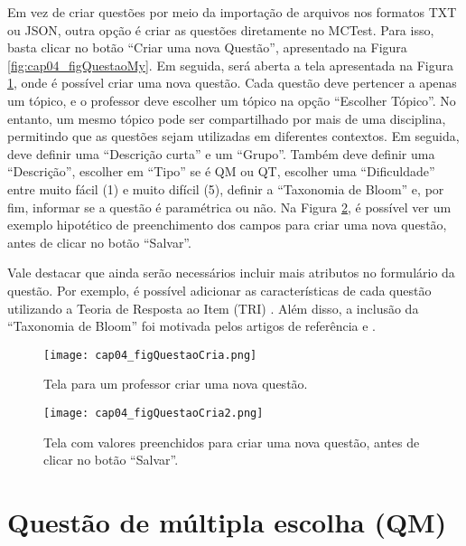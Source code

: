 Em vez de criar questões por meio da importação de arquivos nos formatos TXT ou JSON, outra opção é criar as questões diretamente no MCTest. Para isso, basta clicar no botão ``Criar uma nova Questão'', apresentado na Figura \ref{fig:cap04_figQuestaoMy}. Em seguida, será aberta a tela apresentada na Figura \ref{fig:cap04_figQuestaoCria}, onde é possível criar uma nova questão. Cada questão deve pertencer a apenas um tópico, e o professor deve escolher um tópico na opção ``Escolher Tópico''. No entanto, um mesmo tópico pode ser compartilhado por mais de uma disciplina, permitindo que as questões sejam utilizadas em diferentes contextos. Em seguida, deve definir uma ``Descrição curta'' e um ``Grupo''. Também deve definir uma ``Descrição'', escolher em ``Tipo'' se é QM ou QT, escolher uma ``Dificuldade'' entre muito fácil (1) e muito difícil (5), definir a ``Taxonomia de Bloom'' e, por fim, informar se a questão é paramétrica ou não. Na Figura \ref{fig:cap04_figQuestaoCria2}, é possível ver um exemplo hipotético de preenchimento dos campos para criar uma nova questão, antes de clicar no botão ``Salvar''.

Vale destacar que ainda serão necessários incluir mais atributos no formulário da questão. Por exemplo, é possível adicionar as características de cada questão utilizando a Teoria de Resposta ao Item (TRI) \cite{2021:Zampirolli.Junior.ea,2021:Zampirolli.Batista.ea}. Além disso, a inclusão da ``Taxonomia de Bloom'' foi motivada pelos artigos de referência  e .

\begin{figure}[!ht]
  \centering
  \texttt{[image: cap04\_figQuestaoCria.png]}
  \caption{Tela para um professor criar uma nova questão.}
  \label{fig:cap04_figQuestaoCria}
\end{figure}

\begin{figure}[!ht]
  \centering
  \texttt{[image: cap04\_figQuestaoCria2.png]}
  \caption{Tela com valores preenchidos para criar uma nova questão, antes de clicar no botão ``Salvar''.}
  \label{fig:cap04_figQuestaoCria2}
\end{figure}

\section{Questão de múltipla escolha (QM)}\label{sec:questaoQM}

